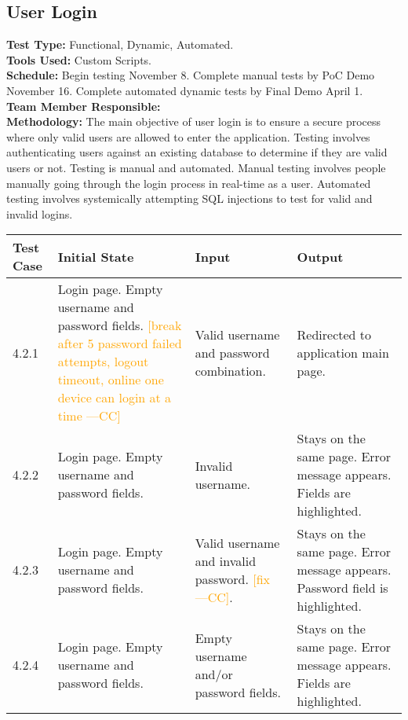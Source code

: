 \documentclass[12pt]{article}
\newcommand{\authornote}[3]{\textcolor{#1}{[#3 ---#2]}}
\newcommand{\authornote}[3]{}
\newcommand{\cc}[1]{\authornote{orange}{CC}{#1}}
\begin{document}
\subsection{User Login}
\textbf{Test Type:} Functional, Dynamic, Automated. \\
\textbf{Tools Used:} Custom Scripts. \\
\textbf{Schedule:} Begin testing November 8. Complete manual tests by PoC Demo November 16. Complete automated dynamic tests by Final Demo April 1. \\
\textbf{Team Member Responsible:} \\
\textbf{Methodology:} The main objective of user login is to ensure a secure process where only valid users are allowed to enter the application. Testing involves authenticating users against an existing database to determine if they are valid users or not. Testing is manual and automated. Manual testing involves people manually going through the login process in real-time as a user. Automated testing involves systemically attempting SQL injections to test for valid and invalid logins.

\begin{longtable}{|p{2cm}|p{3cm}|p{5cm}|p{5cm}|}
\hline
\textbf{Test Case}  & \textbf{Initial State} & \textbf{Input} & \textbf{Output} \\ \hline
4.2.1 & Login page. Empty username and password fields. \cc{break after 5 password failed attempts, logout timeout, online one device can login at a time} & Valid username and password combination. & Redirected to application main page. \\ 
\hline
4.2.2 & Login page. Empty username and password fields. & Invalid username. & Stays on the same page. Error message appears. Fields are highlighted. \\
\hline
4.2.3 & Login page. Empty username and password fields. & Valid username and invalid password. \cc{fix}. & Stays on the same page. Error message appears. Password field is highlighted. \\
\hline
4.2.4 & Login page. Empty username and password fields. & Empty username and/or password fields. & Stays on the same page. Error message appears. Fields are highlighted. \\
\hline
\end{longtable}



\end{document}

